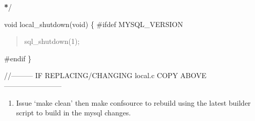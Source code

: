 \documentclass[letterpaper,10pt,english]{sphinxmanual}
\begin{document}
\begin{description}
\begin{description}
\begin{itemize}
\end{itemize}

\sphinxAtStartPar
{\color{red}\bfseries{}*}/

\end{description}

\sphinxAtStartPar
void local\_shutdown(void) \{
\#ifdef MYSQL\_VERSION
\begin{quote}

\sphinxAtStartPar
sql\_shutdown(\sphinxhyphen{}1);
\end{quote}

\sphinxAtStartPar
\#endif
\}

\end{description}

\sphinxAtStartPar
//———\textendash{} IF REPLACING/CHANGING local.c COPY ABOVE ————————\textendash{}
\begin{enumerate}
%
\setcounter{enumi}{5}
\item {} 
\sphinxAtStartPar
Issue ‘make clean’ then make confsource to rebuild using the latest
builder script to build in the mysql changes.

\end{enumerate}
\end{document}
